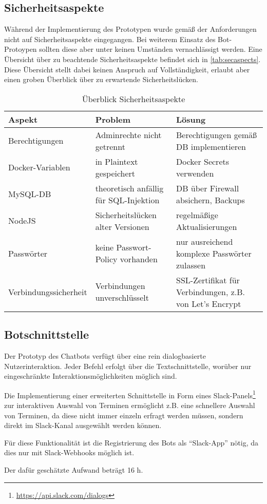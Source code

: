 \subsection{Sicherheitsaspekte}

Während der Implementierung des Prototypen wurde gemäß der Anforderungen nicht auf Sicherheitsaspekte eingegangen. Bei weiterem Einsatz des Bot-Protoypen sollten diese aber unter keinen Umständen vernachlässigt werden. Eine Übersicht über zu beachtende Sicherheitsaspekte befindet sich in \autoref{tab:secaspects}. Diese Übersicht stellt dabei keinen Anspruch auf Vollständigkeit, erlaubt aber einen groben Überblick über zu erwartende Sicherheitslücken.

\begin{table}[h]
    \centering
    \begin{tabularx}{\textwidth}{|X|X|X|}
        \hline
        \textbf{Aspekt} & \textbf{Problem} & \textbf{Lösung} \\
        \hline
        Berechtigungen & Adminrechte nicht getrennt & Berechtigungen gemäß DB implementieren \\
        \hline
        Docker-Variablen & in Plaintext gespeichert & Docker Secrets verwenden \\
        \hline
        MySQL-DB & theoretisch anfällig für SQL-Injektion & DB über Firewall absichern, Backups \\
        \hline
        NodeJS & Sicherheitslücken alter Versionen & regelmäßige Aktualisierungen \\
        \hline
        Passwörter & keine Passwort-Policy vorhanden & nur ausreichend komplexe Passwörter zulassen \\
        \hline
        Verbindungssicherheit & Verbindungen unverschlüsselt & SSL-Zertifikat für Verbindungen, z.B. von Let's Encrypt \\
        \hline
    \end{tabularx}
    \caption{Überblick Sicherheitsaspekte}
    \label{tab:secaspects}
\end{table}

\subsection{Botschnittstelle}
Der Prototyp des Chatbots verfügt über eine rein dialogbasierte Nutzerinteraktion. Jeder Befehl erfolgt über die Textschnittstelle, worüber nur eingeschränkte Interaktionsmöglichkeiten möglich sind.

Die Implementierung einer erweiterten Schnittstelle in Form eines Slack-Panels\footnote{\url{https://api.slack.com/dialogs}} zur interaktiven Auswahl von Terminen ermöglicht z.B. eine schnellere Auswahl von Terminen, da diese nicht immer einzeln erfragt werden müssen, sondern direkt im Slack-Kanal ausgewählt werden können.

Für diese Funktionalität ist die Registrierung des Bots als \enquote{Slack-App} nötig, da dies nur mit Slack-Webhooks möglich ist.

Der dafür geschätzte Aufwand beträgt 16 h.
